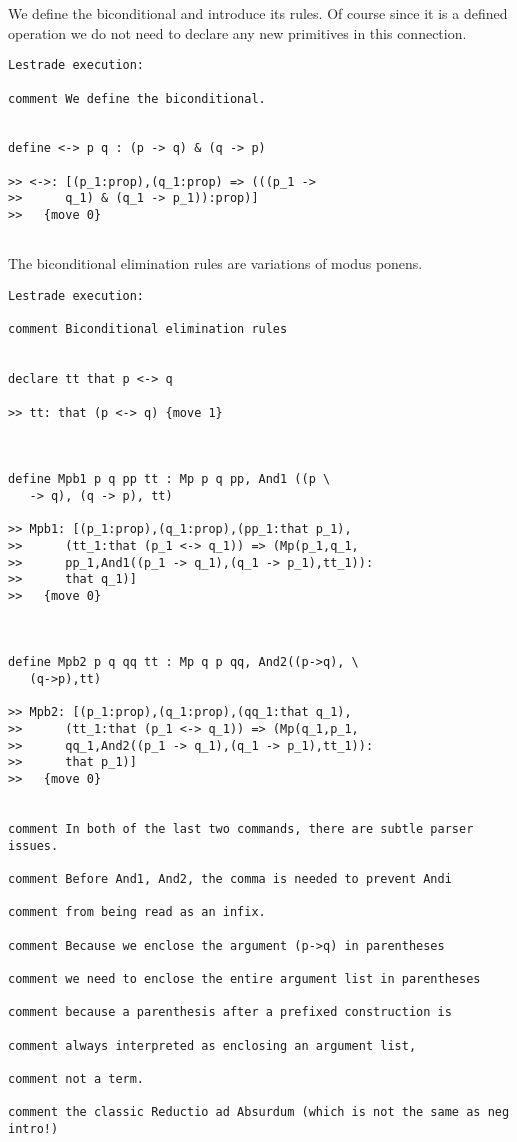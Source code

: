 \documentclass[12pt]{article}
\begin{document}
We define the biconditional and introduce its rules.  Of course since it is a defined operation we do not need
to declare any new primitives in this connection.

\begin{verbatim}Lestrade execution:

comment We define the biconditional.


define <-> p q : (p -> q) & (q -> p)

>> <->: [(p_1:prop),(q_1:prop) => (((p_1 ->
>>      q_1) & (q_1 -> p_1)):prop)]
>>   {move 0}


\end{verbatim}

The biconditional elimination rules are variations of modus ponens.

\begin{verbatim}Lestrade execution:

comment Biconditional elimination rules


declare tt that p <-> q

>> tt: that (p <-> q) {move 1}



define Mpb1 p q pp tt : Mp p q pp, And1 ((p \
   -> q), (q -> p), tt)

>> Mpb1: [(p_1:prop),(q_1:prop),(pp_1:that p_1),
>>      (tt_1:that (p_1 <-> q_1)) => (Mp(p_1,q_1,
>>      pp_1,And1((p_1 -> q_1),(q_1 -> p_1),tt_1)):
>>      that q_1)]
>>   {move 0}



define Mpb2 p q qq tt : Mp q p qq, And2((p->q), \
   (q->p),tt)

>> Mpb2: [(p_1:prop),(q_1:prop),(qq_1:that q_1),
>>      (tt_1:that (p_1 <-> q_1)) => (Mp(q_1,p_1,
>>      qq_1,And2((p_1 -> q_1),(q_1 -> p_1),tt_1)):
>>      that p_1)]
>>   {move 0}


comment In both of the last two commands, there are subtle parser issues.

comment Before And1, And2, the comma is needed to prevent Andi 

comment from being read as an infix.

comment Because we enclose the argument (p->q) in parentheses

comment we need to enclose the entire argument list in parentheses

comment because a parenthesis after a prefixed construction is

comment always interpreted as enclosing an argument list,

comment not a term.

comment the classic Reductio ad Absurdum (which is not the same as neg intro!)

\end{verbatim}
\end{document}
